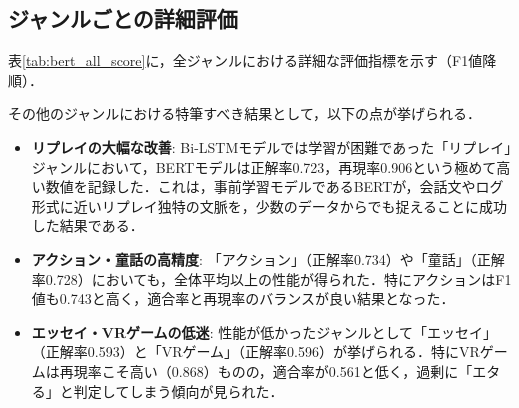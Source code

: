 \documentclass[uplatex, dvipdfmx, 11pt, a4paper, report]{jsbook}
\begin{document}
\subsection{ジャンルごとの詳細評価}
表\ref{tab:bert_all_score}に，全ジャンルにおける詳細な評価指標を示す（F1値降順）．

その他のジャンルにおける特筆すべき結果として，以下の点が挙げられる．
\begin{itemize}
    \item \textbf{リプレイの大幅な改善}:
    Bi-LSTMモデルでは学習が困難であった「リプレイ」ジャンルにおいて，BERTモデルは正解率0.723，再現率0.906という極めて高い数値を記録した．これは，事前学習モデルであるBERTが，会話文やログ形式に近いリプレイ独特の文脈を，少数のデータからでも捉えることに成功した結果である．
    
    \item \textbf{アクション・童話の高精度}:
    「アクション」（正解率0.734）や「童話」（正解率0.728）においても，全体平均以上の性能が得られた．特にアクションはF1値も0.743と高く，適合率と再現率のバランスが良い結果となった．
    
    \item \textbf{エッセイ・VRゲームの低迷}:
    性能が低かったジャンルとして「エッセイ」（正解率0.593）と「VRゲーム」（正解率0.596）が挙げられる．特にVRゲームは再現率こそ高い（0.868）ものの，適合率が0.561と低く，過剰に「エタる」と判定してしまう傾向が見られた．
\end{itemize}

\setlength{}
\setlength{}
\end{document}
